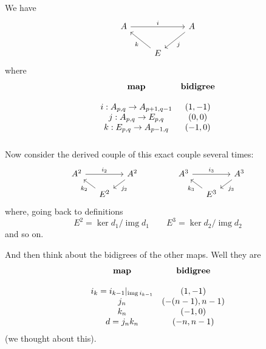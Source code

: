\documentclass{article}
\DeclareMathOperator{\img}{img}
\begin{document}
We have
\[\begin{tikzcd}
	A\arrow[rr,"i"]&&A\arrow[dl,"j"]\\
	&E\arrow[ul,"k"]
\end{tikzcd}\]
where
\begin{align*}
	\begin{array}{cc}
		\text{\bfseries map}&\text{\bfseries bidigree}\\\\
		i:A_{p,q}\to A_{p+1,q-1}&(1,-1)\\
	j:A_{p,q}\to E_{p,q}&(0,0)\\
	k:E_{p,q}\to A_{p-1,q}&(-1,0)\\
	&
	\end{array}
\end{align*}
Now consider the derived couple of this exact couple several times:
\[\begin{tikzcd}[column sep=small,row sep=small]
	A^2\arrow[rr,"i_2"]&&A^2\arrow[dl,"j_2"]\\
	&E^2\arrow[ul,"k_2"]
\end{tikzcd}\qquad\qquad \begin{tikzcd}[column sep=small,row sep=small]
A^3\arrow[rr,"i_3"]&&A^3\arrow[dl,"j_3"]\\
&E^3\arrow[ul,"k_3"]
\end{tikzcd}\]
where, going back to definitions
\[E^2=\ker d_1/\img d_1\qquad E^3=\ker d_2/\img d_2\]
and so on.

And then think about the bidigrees of the other maps. Well they are
\begin{align*}
	\begin{array}{cc}
		\text{\bfseries map}&\text{\bfseries bidigree}\\\\
		i_k=i_{k-1}|_{\img i_{k-1}}&(1,-1)\\
		j_n&(-(n-1),n-1)\\
		k_n&(-1,0)\\
		d=j_nk_n&(-n,n-1)
	\end{array}
\end{align*}
(we thought about this).
\end{document}
